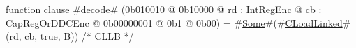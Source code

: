 function clause #\hyperref[zdecode]{decode}# (0b010010 @ 0b10000 @ rd : IntRegEnc @ cb : CapRegOrDDCEnc @ 0b00000001 @ 0b1 @ 0b00) = #\hyperref[zSome]{Some}#(#\hyperref[zCLoadLinked]{CLoadLinked}#(rd, cb, true,  B)) /* CLLB  */
